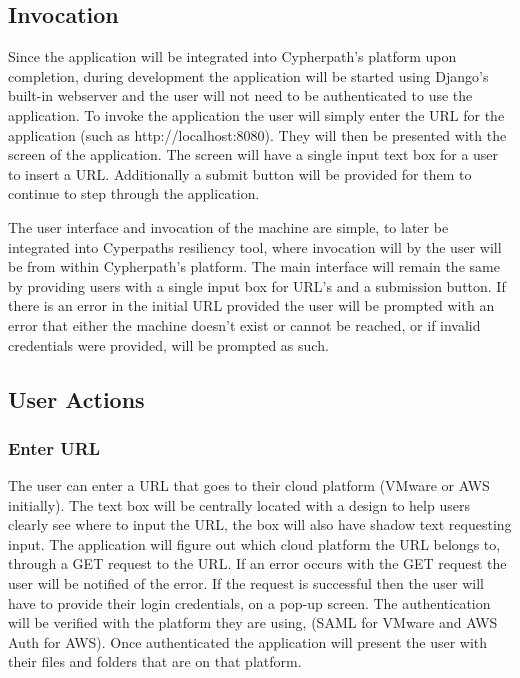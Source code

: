 \documentclass{article}
\begin{document}
        \subsection{Invocation}
        Since the application will be integrated into Cypherpath's platform upon completion, during development the application will be started using Django's built-in webserver and
        the user will not need to be authenticated to use the application. To invoke the application the user will simply enter the URL for the application (such as http://localhost:8080).
        They will then be presented with the screen of the application. The screen will have a single input text box for a user to insert a URL. Additionally 
        a submit button will be provided for them to continue to step through the application. 

        The user interface and invocation of the machine are simple, to later be integrated into Cyperpaths resiliency tool, where invocation will by the user will be from within Cypherpath's
        platform. The main interface will remain the same by providing users with a single input box for URL's and a submission button.
        If there is an error in the initial URL provided the user will be prompted with an error that either the machine doesn't exist or cannot be reached, or if invalid credentials 
        were provided, will be prompted as such.

        \subsection{User Actions}
            \subsubsection{Enter URL}
            The user can enter a URL that goes to their cloud platform (VMware or AWS initially). The text box will be centrally located with a design to help users clearly
            see where to input the URL, the box will also have shadow text requesting input. The application will figure out which cloud platform the URL belongs to, through a GET 
            request to the URL. If an error occurs with the GET request the user will be notified of the error. If the request is successful then the user will have to
            provide their login credentials, on a pop-up screen. The authentication will be verified with the platform they are using, (SAML for VMware and AWS Auth for AWS).
            Once authenticated the application will present the user with their files and folders that are on that platform.
            
\end{document}
